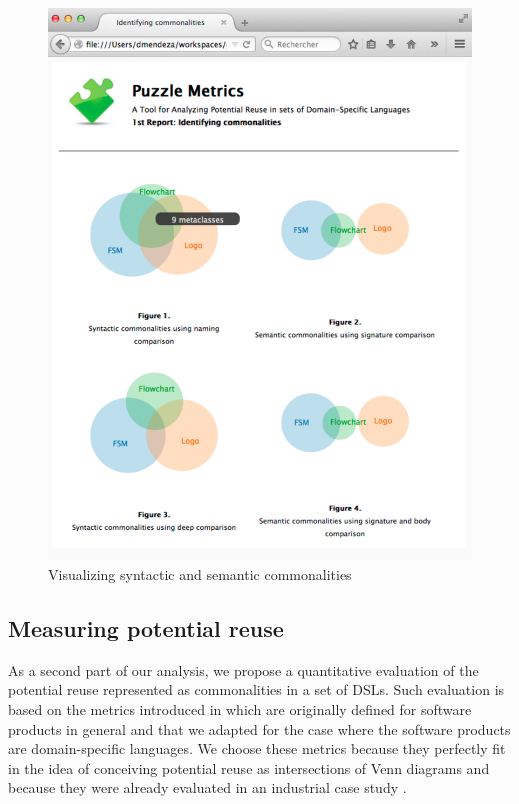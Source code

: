 \begin{figure}
\centering
\includegraphics[width=1\linewidth]{images/domains-inaction.pdf}
\caption{Visualizing syntactic and semantic commonalities}
\label{fig:shape}
\end{figure}

\subsection{Measuring potential reuse}

As a second part of our analysis, we propose a quantitative evaluation of the potential reuse represented as commonalities in a set of DSLs. Such evaluation is based on the metrics introduced in \cite{Berger:2014} which are originally defined for software products in general and that we adapted for the case where the software products are domain-specific languages. We choose these metrics because they perfectly fit in the idea of conceiving potential reuse as intersections of Venn diagrams and because they were already evaluated in an industrial case study \cite{Berger:126283}.

